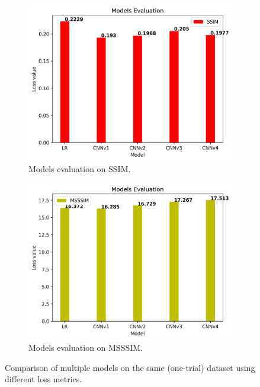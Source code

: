 \begin{figure}[H]
\begin{subfigure}[t]{0.45\textwidth}
    \centering
    \includegraphics[width=\linewidth]{img/ten-trials/models_evaluation_ten_trials_ssim.png}
    \caption{Models evaluation on SSIM.}
  \end{subfigure}
  \begin{subfigure}[t]{0.45\textwidth}
    \centering
    \includegraphics[width=\linewidth]{img/ten-trials/models_evaluation_ten_trials_msssim.png}
    \caption{Models evaluation on MSSSIM.}
  \end{subfigure}
  
\caption{Comparison of multiple models on the same (one-trial) dataset using different loss metrics.}
\label{img:experiments:ten-trials:comparison}
\end{figure}

